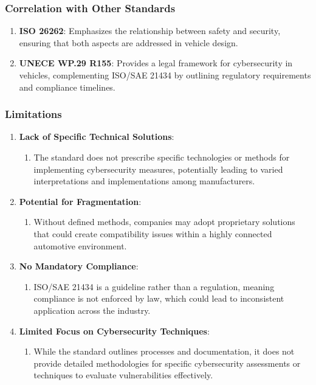 \subsubsection{Correlation with Other Standards}\label{subsubsec:correlation-with-other-standards}

\begin{enumerate}
    \item \textbf{ISO 26262}: Emphasizes the relationship between safety and security, ensuring that both aspects are addressed in vehicle design.
    \item \textbf{UNECE WP.29 R155}: Provides a legal framework for cybersecurity in vehicles, complementing ISO/SAE 21434 by outlining regulatory requirements and compliance timelines.
\end{enumerate}

\subsubsection{Limitations}\label{subsubsec:limitations}

\begin{enumerate}
    \item \textbf{Lack of Specific Technical Solutions}:
    \begin{enumerate}
        \item The standard does not prescribe specific technologies or methods for implementing cybersecurity measures, potentially leading to varied interpretations and implementations among manufacturers.
    \end{enumerate}

    \item \textbf{Potential for Fragmentation}:
    \begin{enumerate}
        \item Without defined methods, companies may adopt proprietary solutions that could create compatibility issues within a highly connected automotive environment.
    \end{enumerate}

    \item \textbf{No Mandatory Compliance}:
    \begin{enumerate}
        \item ISO/SAE 21434 is a guideline rather than a regulation, meaning compliance is not enforced by law, which could lead to inconsistent application across the industry.
    \end{enumerate}

    \item \textbf{Limited Focus on Cybersecurity Techniques}:
    \begin{enumerate}
        \item While the standard outlines processes and documentation, it does not provide detailed methodologies for specific cybersecurity assessments or techniques to evaluate vulnerabilities effectively.
    \end{enumerate}
\end{enumerate}


